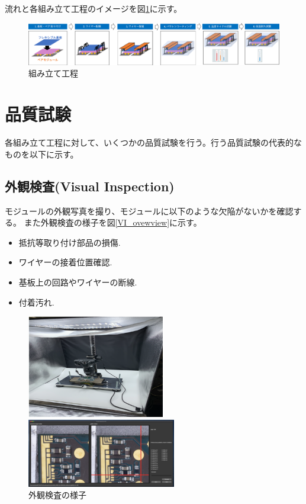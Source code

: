流れと各組み立て工程のイメージを図\ref{assembly_flow}に示す。
\begin{figure}[bpt]\centering
\includegraphics[width=14cm]{assembly_flow}
\caption[組み立て工程]{組み立て工程}
\label{assembly_flow}
\end{figure}

\section{品質試験}
各組み立て工程に対して、いくつかの品質試験を行う。行う品質試験の代表的なものを以下に示す。

\subsection{外観検査(Visual Inspection)}
モジュールの外観写真を撮り、モジュールに以下のような欠陥がないかを確認する。
また外観検査の様子を図\ref{VI_ovewview}に示す。
\begin{itemize}
  \item 抵抗等取り付け部品の損傷.
  \item ワイヤーの接着位置確認.
  \item 基板上の回路やワイヤーの断線.
  \item 付着汚れ.
\end{itemize}

\begin{figure}[bpt]\centering
  \begin{minipage}{0.4\hsize}
    \begin{center}
    \includegraphics[width=60mm]{VI_setup}
    \end{center}
  \end{minipage}
  \begin{minipage}{0.4\hsize}
    \begin{center}
    \includegraphics[width=65mm]{VI_analysis}
    \end{center}
  \end{minipage}
  \caption[外観検査の様子]{外観検査の様子}
  \label{VI_overview}
\end{figure}

